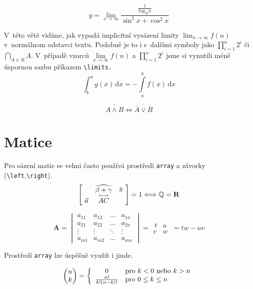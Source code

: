 \documentclass[a4paper,11pt,twocolumn]{article}
\begin{document}
$$y = \lim_{x\to\infty}\frac{\frac{1}{log_{10}x}}{\sin^{2}x+\cos^{2}x} $$

V~této větě vidíme, jak vypadá implicitní vysázení limity $\lim_{n\to\infty} f(n)$ v~normálnom odstavci textu. Podobně je to i s~dalšími symboly jako
$\prod_{i=1}^n 2^i$ či $\bigcap_{A\in B} A$. V~případě vzorců $\lim\limits_{x\to\infty} f(n)$ a $\prod\limits_{i=1}^n 2^i$ jsme si vynutili méně úspornou sazbu příkazem \verb/\limits./
\begin{equation}
\int_b^a g(x)\,\mathrm{d}x = -\underset{a}{\overset{b}{\int}} f(x)\,\mathrm{d}x
\end{equation}

\begin{equation}
\overline{\overline{A \wedge B}} \Leftrightarrow \overline{\overline{A} \vee \overline{B}}
\end{equation}

\section{Matice}

Pro sázení matic se velmi často používá prostředí \texttt{array} a závorky (\verb/\left/,\verb/\right/).
\begin{equation*}
    \begin{bmatrix}
        &\widehat{\beta + \gamma} & \hat{\pi}\ \\
        \ \vec{a}& \overset{\longleftrightarrow}{AC} &
    \end{bmatrix} = 1 \Longleftrightarrow \mathbb{Q} = \mathbf{R}\\
\end{equation*}

$$\mathbf{A} = \begin{vmatrix}a_{11} & a_{12} & \dots & a_{1n}\\ a_{21} & a_{22} & \dots & a_{2n}\\ \vdots & \vdots & \ddots & \vdots\\ a_{m1} & a_{m2} & \dots & a_{mn}\end{vmatrix} = \begin{matrix}\ t & u \\ v & w\ \end{matrix} = tw - uv$$

Prostředí \texttt{array} lze úspěšně využít i jinde.

$$\begin{pmatrix}n\\k\end{pmatrix} = \left\{
\begin{array}{c l}
0 & \text{pro } k < 0 \  \text{nebo}\  k > n \\
\frac{n!}{k!(n-k)!} & \text{pro}\ 0 \leq k \leq n
\end{array} \right.$$
\end{document}
